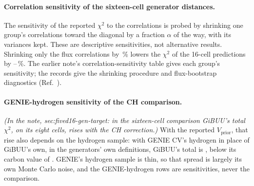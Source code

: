 \paragraph{Correlation sensitivity of the sixteen-cell generator distances.} The sensitivity of the reported $\chi^2$ to the correlations is probed by shrinking one group's correlations toward the diagonal by a fraction $\alpha$ of the way, with its variances kept. These are descriptive sensitivities, not alternative results. Shrinking only the flux correlations by \,\% lowers the $\chi^2$ of the 16-cell predictions by --\,\%. The earlier note's correlation-sensitivity table gives each group's sensitivity; the records give the shrinking procedure and flux-bootstrap diagnostics (Ref.~\cite{NoteRecords2026}).

\paragraph{GENIE-hydrogen sensitivity of the CH comparison.} \noindent\emph{(In the note, sec:fived16-gen-target: in the sixteen-cell comparison GiBUU's total $\chi^2$, on its eight cells, rises with the CH correction.)} With the reported $V_{\mathrm{prior}}$, that rise also depends on the hydrogen sample: with GENIE CV's hydrogen in place of GiBUU's own, in the generators' own definitions, GiBUU's total is , below its carbon value of . GENIE's hydrogen sample is thin, so that spread is largely its own Monte Carlo noise, and the GENIE-hydrogen rows are sensitivities, never the comparison.


